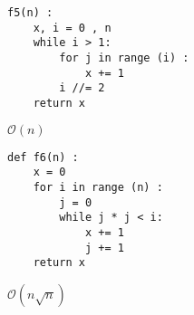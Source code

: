 \begin{lstlisting}
f5(n) :
    x, i = 0 , n
    while i > 1:
        for j in range (i) :
            x += 1
        i //= 2
    return x
\end{lstlisting}
\ifprof
\begin{corrige}
$\mathcal{O}( n)$
\end{corrige}
\else
\fi



\begin{lstlisting}
def f6(n) :
    x = 0
    for i in range (n) :
        j = 0
        while j * j < i:
            x += 1
            j += 1
    return x
\end{lstlisting}
\ifprof
\begin{corrige}
$\mathcal{O}( n\sqrt{n})$
\end{corrige}
\else

\fi

